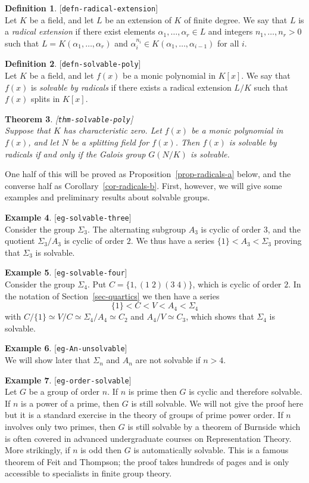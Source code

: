 \documentclass{amsart}
\newcommand{\lbl}[1]{\label{#1}\textup{[\texttt{#1}]}\ \\}
\newcommand{\lbl}{\label}
\newcommand{\al}        {\alpha}
\newcommand{\Sg}        {\Sigma}
\renewcommand{\:}{\colon}
\newtheorem{theorem}{Theorem}[section]
\theoremstyle{definition}
\newtheorem{definition}[theorem]{Definition}
\newtheorem{example}[theorem]{Example}
\begin{document}
\begin{definition}\lbl{defn-radical-extension}
 Let $K$ be a field, and let $L$ be an extension of $K$ of finite
 degree.  We say that $L$ is a \emph{radical extension} if there
 exist elements $\al_1,\dotsc,\al_r\in L$ and integers
 $n_1,\dotsc,n_r>0$ such that $L=K(\al_1,\dotsc,\al_r)$ and
 $\al_i^{n_i}\in K(\al_1,\dotsc,\al_{i-1})$ for all $i$.
\end{definition}

\begin{definition}\lbl{defn-solvable-poly}
 Let $K$ be a field, and let $f(x)$ be a monic polynomial in $K[x]$.
 We say that $f(x)$ is \emph{solvable by radicals} if there exists a
 radical extension $L/K$ such that $f(x)$ splits in $K[x]$.
\end{definition}

\begin{theorem}\lbl{thm-solvable-poly}
 Suppose that $K$ has characteristic zero.  Let $f(x)$ be a monic
 polynomial in $f(x)$, and let $N$ be a splitting field for $f(x)$.
 Then $f(x)$ is solvable by radicals if and only if the Galois group
 $G(N/K)$ is solvable.
\end{theorem}

One half of this will be proved as Proposition~\ref{prop-radicals-a}
below, and the converse half as Corollary~\ref{cor-radicals-b}.
First, however, we will give some examples and preliminary results
about solvable groups.

\begin{example}\lbl{eg-solvable-three}
 Consider the group $\Sg_3$.  The alternating subgroup $A_3$ is cyclic
 of order $3$, and the quotient $\Sg_3/A_3$ is cyclic of order $2$.
 We thus have a series $\{1\}<A_3<\Sg_3$ proving that $\Sg_3$ is
 solvable. 
\end{example}
\begin{example}\lbl{eg-solvable-four}
 Consider the group $\Sg_4$.  Put $C=\{1,(1\;2)(3\;4)\}$, which is
 cyclic of order $2$.  In the notation of Section~\ref{sec-quartics}
 we then have a series
 \[ \{1\} < C < V < A_4 < \Sg_4 \]
 with $C/\{1\}\simeq V/C\simeq\Sg_4/A_4\simeq C_2$ and
 $A_4/V\simeq C_3$, which shows that $\Sg_4$ is solvable.
\end{example}
\begin{example}\lbl{eg-An-unsolvable}
 We will show later that $\Sg_n$ and $A_n$ are not solvable if $n>4$. 
\end{example}
\begin{example}\lbl{eg-order-solvable}
 Let $G$ be a group of order $n$.  If $n$ is prime then $G$ is cyclic
 and therefore solvable.  If $n$ is a power of a prime, then $G$ is
 still solvable.  We will not give the proof here but it is a standard
 exercise in the theory of groups of prime power order.  If $n$
 involves only two primes, then $G$ is still solvable by a theorem of
 Burnside which is often covered in advanced undergraduate courses on
 Representation Theory.  More strikingly, if $n$ is odd then $G$ is
 automatically solvable.  This is a famous theorem of Feit and
 Thompson; the proof takes hundreds of pages and is only accessible to
 specialists in finite group theory.
\end{example}
\end{document}
